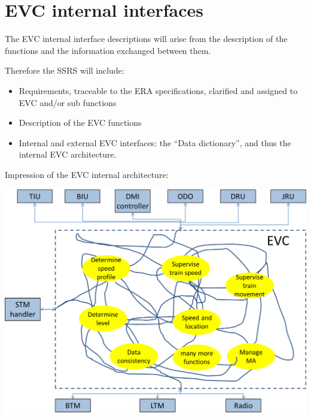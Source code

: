 \documentclass{template/openetcs_article}
\begin{document}
\section[EVC internal interfaces]{EVC internal interfaces}

\bigskip

The EVC internal interface descriptions will arise from the description of the functions and the information exchanged between them.



Therefore the SSRS will include:

\begin{itemize}
\item Requirements, traceable to the ERA specifications, clarified and assigned to EVC and/or sub functions
\item Description of the EVC functions
\item Internal and external EVC interfaces: the {\textquotedblleft}Data dictionary{\textquotedblright}, and thus the internal EVC architecture.
\end{itemize}


Impression of the EVC internal architecture:

\begin{center}
\includegraphics[scale=0.6]{figs/impression}

\end{center}
\end{document}
